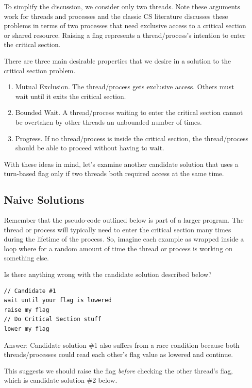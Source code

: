To simplify the discussion, we consider only two threads.
Note these arguments work for threads and processes and the classic CS literature discusses these problems in terms of two processes that need exclusive access to a critical section or shared resource.
Raising a flag represents a thread/process's intention to enter the critical section.

There are three main desirable properties that we desire in a solution to the critical section problem.

\begin{enumerate}
\item Mutual Exclusion. The thread/process gets exclusive access.
  Others must wait until it exits the critical section.
\item Bounded Wait. A thread/process waiting to enter the critical section cannot be overtaken by other threads an unbounded number of times.
\item Progress. If no thread/process is inside the critical section, the thread/process should be able to proceed without having to wait.
\end{enumerate}

With these ideas in mind, let's examine another candidate solution that uses a turn-based flag only if two threads both required access at the same time.

\subsection{Naive Solutions}

Remember that the pseudo-code outlined below is part of a larger program.
The thread or process will typically need to enter the critical section many times during the lifetime of the process.
So, imagine each example as wrapped inside a loop where for a random amount of time the thread or process is working on something else.

Is there anything wrong with the candidate solution described below?

\begin{lstlisting}
// Candidate #1
wait until your flag is lowered
raise my flag
// Do Critical Section stuff
lower my flag
\end{lstlisting}

Answer: Candidate solution \#1 also suffers from a race condition because both threads/processes could read each other's flag value as lowered and continue.

This suggests we should raise the flag \emph{before} checking the other thread's flag, which is candidate solution \#2 below.

